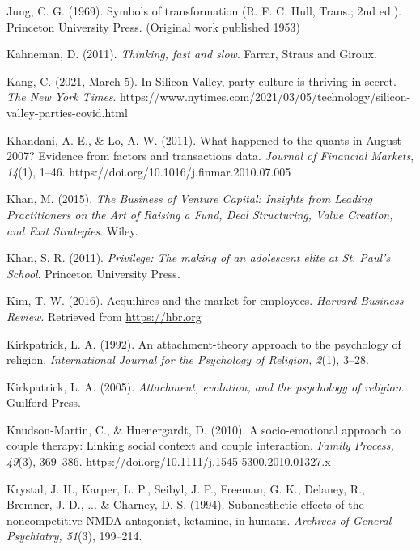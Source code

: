 \begin{thebibliography}{}
    Jung, C. G. (1969). Symbols of transformation (R. F. C. Hull, Trans.; 2nd ed.). Princeton University Press. (Original work published 1953)

    
    Kahneman, D. (2011). \textit{Thinking, fast and slow}. Farrar, Straus and Giroux.

    Kang, C. (2021, March 5). In Silicon Valley, party culture is thriving in secret. \textit{The New York Times}. https://www.nytimes.com/2021/03/05/technology/silicon-valley-parties-covid.html

    Khandani, A. E., \& Lo, A. W. (2011). What happened to the quants in August 2007? Evidence from factors and transactions data. \textit{Journal of Financial Markets}, \textit{14}(1), 1–46. https://doi.org/10.1016/j.finmar.2010.07.005
    
    Khan, M. (2015). \textit{The Business of Venture Capital: Insights from Leading Practitioners on the Art of Raising a Fund, Deal Structuring, Value Creation, and Exit Strategies}. Wiley.

    Khan, S. R. (2011). \textit{Privilege: The making of an adolescent elite at St. Paul's School}. Princeton University Press.

    Kim, T. W. (2016). Acquihires and the market for employees. \textit{Harvard Business Review}. Retrieved from \url{https://hbr.org}

    Kirkpatrick, L. A. (1992). An attachment-theory approach to the psychology of religion. \textit{International Journal for the Psychology of Religion, 2}(1), 3–28.

    Kirkpatrick, L. A. (2005). \textit{Attachment, evolution, and the psychology of religion}. Guilford Press.

    Knudson-Martin, C., \& Huenergardt, D. (2010). A socio-emotional approach to couple therapy: Linking social context and couple interaction. \textit{Family Process, 49}(3), 369–386. https://doi.org/10.1111/j.1545-5300.2010.01327.x

    Krystal, J. H., Karper, L. P., Seibyl, J. P., Freeman, G. K., Delaney, R., Bremner, J. D., ... \& Charney, D. S. (1994). Subanesthetic effects of the noncompetitive NMDA antagonist, ketamine, in humans. \textit{Archives of General Psychiatry, 51}(3), 199–214.


\end{thebibliography}
